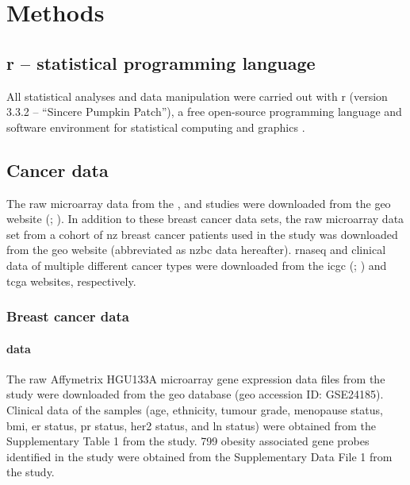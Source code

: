 \chapter{Methods}
\label{ch:methods}

\section{\gls{r} -- statistical programming language}
\label{sec:r}

All statistical analyses and data manipulation were carried out with \gls{r} (version 3.3.2 -- ``Sincere Pumpkin Patch''), a free open-source programming language and software environment for statistical computing and graphics \citep{R2016}.

\section{Cancer data}
\label{sec:data}

The raw microarray data from the \citet{Creighton2012}, \citet{Fuentes-Mattei2014} and \citet{Gatza2010a}  studies were downloaded from the \gls{geo} website (\citealp{Edgar2002}; ).
In addition to these breast cancer data sets, the raw microarray data set from a cohort of \gls{nz} breast cancer patients used in the \citet{Print2016} study was downloaded from the \gls{geo} website (abbreviated as \gls{nzbc} data hereafter).
\gls{rnaseq} and clinical data of multiple different cancer types were downloaded from the \gls{icgc} (; \citealp{Zhang2011}) and \gls{tcga}  websites, respectively.

\subsection{Breast cancer data}
\label{sub:breast_cancer_data}

\subsubsection{\citet{Creighton2012} data}
\label{ssub:creighton2012_data}

The raw Affymetrix HGU\-133A microarray gene expression data files from the \citet{Creighton2012} study were downloaded from the \gls{geo} database (\gls{geo} accession ID: GSE24185).
Clinical data of the samples (age, ethnicity, tumour grade, menopause status, \gls{bmi}, \gls{er} status, \gls{pr} status, \gls{her2} status, and \gls{ln} status) were obtained from the Supplementary Table 1 from the \citet{Creighton2012} study.
799 obesity associated gene probes identified in the \citet{Creighton2012} study were obtained from the Supplementary Data File 1 from the \citet{Creighton2012} study.

